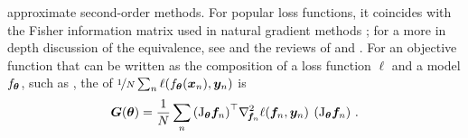 approximate second-order methods. For popular loss functions, it coincides with
the Fisher information matrix used in natural gradient methods
\citep{amari1998natural}; for a more in depth discussion of the equivalence, see
 and the reviews of
\citet{martens2014new} and \citet{kunstner2019limitations}. For an objective
function that can be written as the composition of a loss function $\ell$ and a
model $f_{{\bm{\theta}}}$, such as , the \GGN%
of $\nicefrac{1}{N} \sum_n \ell(f_{{\bm{\theta}}}({\bm{x}}_n), {\bm{y}}_n)$ is
\begin{equation}
  \label{backpack::eq:main-ggn}
  {\bm{G}}({\bm{\theta}}) =
  \frac{1}{N} \sum_n
  {\left(\mathrm{J}_{\bm{\theta}} {\bm{f}}_n \right)}^\top
  \nabla_{\!{{\bm{f}}_n}}^{2} \ell({\bm{f}}_n, {\bm{y}}_n) \:
  \left(\mathrm{J}_{\bm{\theta}} {\bm{f}}_n\right)\,{.}
\end{equation}

